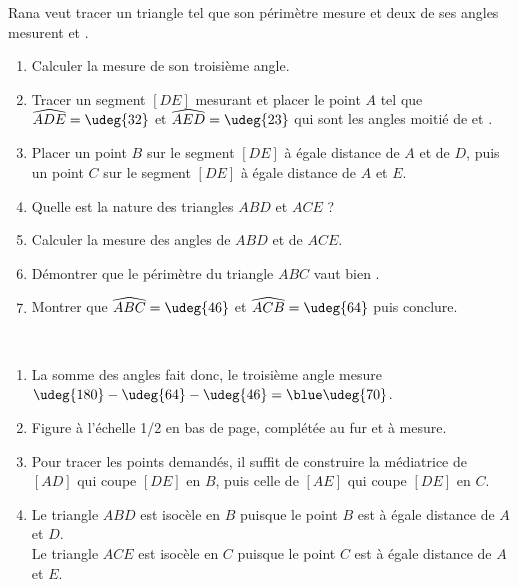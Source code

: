 \begin{colonne*exercice}
\begin{exercice} %
   Rana veut tracer un triangle tel que son périmètre mesure  et deux de ses angles mesurent  et .
   \begin{enumerate}
      \item Calculer la mesure de son troisième angle.
      \item Tracer un segment $[DE]$ mesurant  et placer le point $A$ tel que $\widehat{ADE} =\udeg{32}$ et $\widehat{AED} =\udeg{23}$ qui sont les angles moitié de  et .
      \item Placer un point $B$ sur le segment $[DE]$ à égale distance de $A$ et de $D$, puis un point $C$ sur le segment $[DE]$ à égale distance de $A$ et $E$. 
      \item Quelle est la nature des triangles $ABD$ et $ACE$ ?
      \item Calculer la mesure des angles de $ABD$ et de $ACE$.
      \item Démontrer que le périmètre du triangle $ABC$ vaut bien .
      \item Montrer que $\widehat{ABC} =\udeg{46}$ et $\widehat{ACB} =\udeg{64}$ puis conclure.
   \end{enumerate}
\end{exercice}

\begin{corrige}
   \ \\ [-5mm]
    \begin{enumerate}
      \item La somme des angles fait  donc, le troisième angle mesure $\udeg{180}-\udeg{64}-\udeg{46} =\blue\udeg{70}$.
      \item Figure à l'échelle 1/2 en bas de page, complétée au fur et à mesure.
      \item Pour tracer les points demandés, il suffit de construire la médiatrice de $[AD]$ qui coupe $[DE]$ en $B$, puis celle de $[AE]$ qui coupe $[DE]$ en $C$.
      \item {\blue Le triangle $ABD$ est isocèle en $B$} puisque le point $B$ est à égale distance de $A$ et $D$. \\
         {\blue Le triangle $ACE$ est isocèle en $C$} puisque le point $C$ est à égale distance de $A$ et $E$.
   \end{enumerate}
   
\Coupe


\end{corrige}
\end{colonne*exercice}
